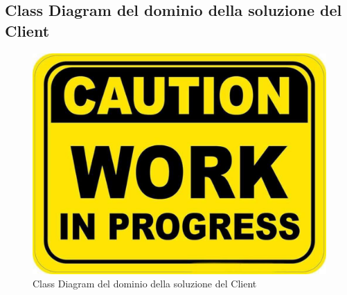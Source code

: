         \subsection{Class Diagram del dominio della soluzione del Client}
            \begin{figure}[htbp!]
                \centering
                    \includegraphics[width=0.1\linewidth]{Immagini/WorkInProgress.pdf}
                \caption{Class Diagram del dominio della soluzione del Client}
                \label{fig:Class Diagram del dominio della soluzione del Client}
            \end{figure}